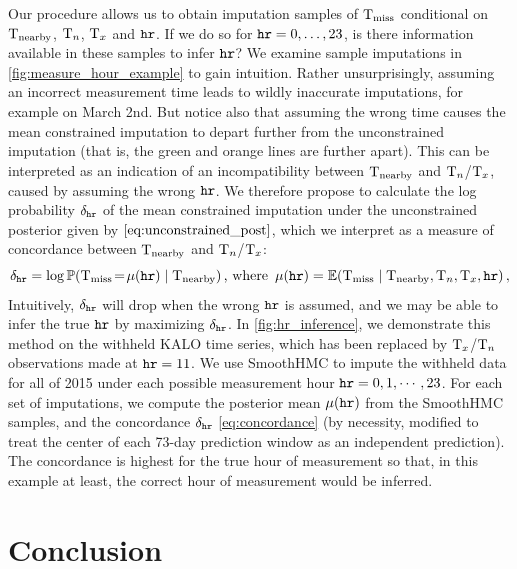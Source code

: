 \documentclass[12pt]{article}
\begin{document}
Our procedure allows us to obtain imputation samples of \(\T_\miss\) conditional on \(\T_\obs\), \(\Tn\), \(\Tx\) and \(\hour\).
If we do so for \(\hour=0,\dotsc,23\), is there information available in these samples to infer \(\hour\)?
We examine sample imputations in \autoref{fig:measure_hour_example} to gain intuition.
Rather unsurprisingly, assuming an incorrect measurement time leads to wildly inaccurate imputations, for example on March 2nd.
But notice also that assuming the wrong time causes the mean constrained imputation to depart further from the unconstrained imputation
(that is, the green and orange lines are further apart).
This can be interpreted as an indication of an incompatibility between \(\T_\obs\) and \(\Tn\)/\(\Tx\), caused by assuming the wrong \(\hour\).
We therefore propose to calculate the log probability \(\concordance_\hour\) of the mean constrained imputation under the unconstrained posterior given by \(\autoref{eq:unconstrained_post}\), which we interpret as a measure of concordance between \(\T_\obs\) and \(\Tn\)/\(\Tx\):
\begin{equation}
    \concordance_\hour = \log \Pr\del{ \T_\miss \! = \! \mu\del{\hour} \mid \T_\obs }
    \,\text{, where}\ \,
    \mu\del{\hour} = \E\del{ \T_\miss \mid \T_\obs, \Tn, \Tx, \hour }\,,
\label{eq:concordance}
\end{equation}
Intuitively, \(\concordance_\hour\) will drop when the wrong \(\hour\) is assumed,
and we may be able to infer the true \(\hour\) by maximizing \(\concordance_\hour\).
In \autoref{fig:hr_inference}, we demonstrate this method on the withheld KALO time series, which
has been replaced by \(\Tx\)/\(\Tn\) observations made at \(\hour=11\).
We use SmoothHMC to impute the withheld data for all of 2015 under each possible measurement hour \(\hour=0,1,\cdots,23\).
For each set of imputations, we compute the posterior mean \(\mu\del{\hour}\) from the SmoothHMC samples, 
and the concordance \(\concordance_\hour\) \autoref{eq:concordance} (by necessity, modified to treat the center of each 73-day prediction window as an independent prediction).
The concordance is highest for the true hour of measurement so that, in this example at least, the correct hour of measurement would be inferred.

\section{Conclusion}\label{sec:conclusion}
\end{document}
